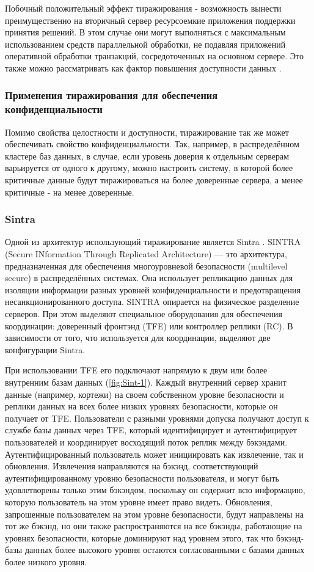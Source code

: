 Побочный положительный эффект тиражирования - возможность вынести преимущественно на вторичный
сервер ресурсоемкие приложения поддержки принятия решений. В этом случае они могут выполняться с
максимальным использованием средств параллельной обработки, не подавляя приложений оперативной
обработки транзакций, сосредоточенных на основном сервере. Это также можно рассматривать как фактор
повышения доступности данных \cite{data-replication}.

\subsubsection{Применения тиражирования для обеспечения конфиденциальности}

Помимо свойства целостности и доступности, тиражирование так же может обеспечивать свойство
конфиденциальности. Так, например, в распределённом кластере баз данных, в случае, если уровень
доверия к отдельным серверам варьируется от одного к другому, можно настроить систему, в
которой более критичные данные будут тиражироваться на более доверенные сервера, а менее
критичные - на менее доверенные.

\subsubsection{Sintra}

Одной из архитектур использующий тиражирование является Sintra \cite{Sintara}. SINTRA (Secure INformation Through Replicated Architecture) — это архитектура, предназначенная для обеспечения многоуровневой безопасности (multilevel secure) в распределённых системах. Она использует репликацию данных для изоляции информации разных уровней конфиденциальности и предотвращения несанкционированного доступа. SINTRA опирается на физическое разделение серверов. При этом выделяют специальное оборудования для обеспечения координации: доверенный фронтэнд (TFE) или контроллер реплики (RC). В зависимости от того, что используется для координации, выделяют две конфигурации Sintra.

При использовании TFE его подключают напрямую к двум или более внутренним базам данных (\ref{fig:Sint-1}).
Каждый внутренний сервер хранит данные (например, кортежи) на своем собственном уровне безопасности и реплики данных на всех более низких уровнях безопасности, которые он
получает от TFE. Пользователи с разными уровнями допуска получают доступ к службе базы данных через TFE, который идентифицирует и аутентифицирует пользователей и координирует
восходящий поток реплик между бэкэндами. Аутентифицированный пользователь может инициировать как извлечение, так и обновления. Извлечения направляются на бэкэнд,
соответствующий аутентифицированному уровню безопасности пользователя, и
могут быть удовлетворены только этим бэкэндом, поскольку он содержит всю
информацию, которую пользователь на этом уровне имеет право
видеть. Обновления, запрошенные пользователем на этом уровне безопасности,
будут направлены на тот же бэкэнд, но они также
распространяются на все бэкэнды, работающие на уровнях безопасности, которые
доминируют над уровнем этого, так что бэкэнд-базы данных более высокого уровня
остаются согласованными с базами данных более низкого уровня. 

